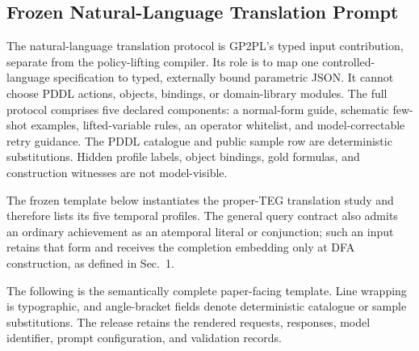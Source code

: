 \subsection{Frozen Natural-Language Translation Prompt}
\label{app:translation-prompt}

The natural-language translation protocol is GP2PL's typed input contribution,
separate from the policy-lifting compiler. Its role is to map one controlled-language
specification to typed, externally bound parametric \ltlf{} JSON. It cannot
choose PDDL actions, objects, bindings, or domain-library modules. The full
protocol comprises five declared components: a normal-form guide,
schematic few-shot examples, lifted-variable rules, an operator whitelist, and
model-correctable retry guidance. The PDDL catalogue and public sample row are
deterministic substitutions. Hidden profile labels, object bindings, gold
formulas, and construction witnesses are not model-visible.

The frozen template below instantiates the proper-TEG translation study and
therefore lists its five temporal profiles. The general query contract also
admits an ordinary achievement as an atemporal literal or conjunction; such an
input retains that form and receives the completion embedding only at DFA
construction, as defined in Sec.~1.

The following is the semantically complete paper-facing template. Line wrapping
is typographic, and angle-bracket fields denote deterministic catalogue or
sample substitutions. The release retains the rendered requests, responses,
model identifier, prompt configuration, and validation records.

